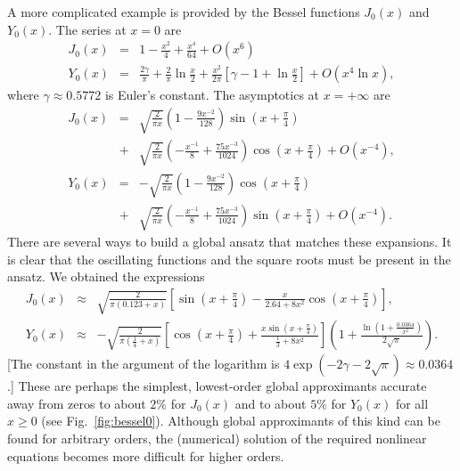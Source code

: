 \documentclass{llncs}
\begin{document}
A more complicated example is provided by the Bessel functions $J_{0}\left(x\right)$
and $Y_{0}\left(x\right)$. The series at $x=0$ are\begin{eqnarray*}
J_{0}\left(x\right) & = & 1-\frac{x^{2}}{4}+\frac{x^{4}}{64}+O\left(x^{6}\right)\\
Y_{0}\left(x\right) & = & \frac{2\gamma }{\pi }+\frac{2}{\pi }\ln \frac{x}{2}+\frac{x^{2}}{2\pi }\left[\gamma -1+\ln \frac{x}{2}\right]+O\left(x^{4}\ln x\right),
\end{eqnarray*}
where $\gamma \approx 0.5772$ is Euler's constant. The asymptotics
at $x=+\infty $ are\begin{eqnarray*}
J_{0}\left(x\right) & = & \sqrt{\frac{2}{\pi x}}\left(1-\frac{9x^{-2}}{128}\right)\sin \left(x+\frac{\pi }{4}\right)\\
 & + & \sqrt{\frac{2}{\pi x}}\left(-\frac{x^{-1}}{8}+\frac{75x^{-3}}{1024}\right)\cos \left(x+\frac{\pi }{4}\right)+O\left(x^{-4}\right),\\
Y_{0}\left(x\right) & = & -\sqrt{\frac{2}{\pi x}}\left(1-\frac{9x^{-2}}{128}\right)\cos \left(x+\frac{\pi }{4}\right)\\
 & + & \sqrt{\frac{2}{\pi x}}\left(-\frac{x^{-1}}{8}+\frac{75x^{-3}}{1024}\right)\sin \left(x+\frac{\pi }{4}\right)+O\left(x^{-4}\right).
\end{eqnarray*}
There are several ways to build a global ansatz that matches these
expansions. It is clear that the oscillating functions and the square
roots must be present in the ansatz. We obtained the expressions\begin{eqnarray*}
J_{0}\left(x\right) & \approx  & \sqrt{\frac{2}{\pi \left(0.123+x\right)}}\left[\sin \left(x+\frac{\pi }{4}\right)-\frac{x}{2.64+8x^{2}}\cos \left(x+\frac{\pi }{4}\right)\right],\\
Y_{0}\left(x\right) & \approx  & -\sqrt{\frac{2}{\pi \left(\frac{1}{4}+x\right)}}\left[\cos \left(x+\frac{\pi }{4}\right)+\frac{x\sin \left(x+\frac{\pi }{4}\right)}{\frac{1}{3}+8x^{2}}\right]\left(1+\frac{\ln \left(1+\frac{0.0364}{x^{2}}\right)}{2\sqrt{\pi }}\right).
\end{eqnarray*}
 {[}The constant in the argument of the logarithm is $4\exp \left(-2\gamma -2\sqrt{\pi }\right)\approx 0.0364$.{]}
These are perhaps the simplest, lowest-order global approximants accurate
away from zeros to about $2\%$ for $J_{0}\left(x\right)$ and to
about $5\%$ for $Y_{0}\left(x\right)$ for all $x\geq 0$ (see Fig.~\ref{fig:bessel0}).
Although global approximants of this kind can be found for arbitrary
orders, the (numerical) solution of the required nonlinear equations
becomes more difficult for higher orders.
\end{document}

